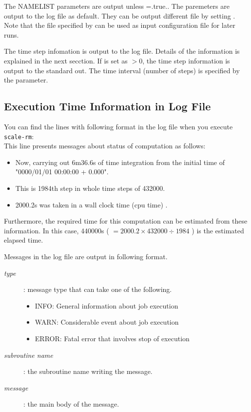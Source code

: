 The NAMELIST parameters are output unless =.true..
The paremeters are output to the log file as default.
They can be output different file by setting .
Note that the file specified by  can be used as input configuration file for later runs.

The time step infomation is output to the log file.
Details of the information is explained in the next secction.
If  is set as $>0$, the time step information is output to the standard out.
The time interval (number of steps) is specified by the parameter.




\subsection{Execution Time Information in Log File}

You can find the lines with following format in the log file when you execute \verb|scale-rm|:\\
This line presents messages about status of computation as follows:
\begin{itemize}
 \item Now, carrying out 6m36.6s of time integration from the initial time of "0000/01/01 00:00:00 + 0.000".
 \item This is 1984th step in whole time steps of 432000.
 \item 2000.2s was taken in a wall clock time (cpu time) .
\end{itemize}
Furthermore, the required time for this computation can be estimated from these information.
In this case, 440000s ( $= 2000.2 \times 432000 \div 1984$ ) is the estimated elapsed time.

\vspace{2ex}
Messages in the log file are output in following format.
\begin{description}
 \item[{\it type}]: message type that can take one of the following.
   \begin{itemize}
    \item INFO: General information about job execution
    \item WARN: Considerable event about job execution
    \item ERROR: Fatal error that involves stop of execution
   \end{itemize}
 \item[{\it subroutine name}]: the subroutine name writing the message.
 \item[{\it message}]: the main body of the message.
\end{description}



